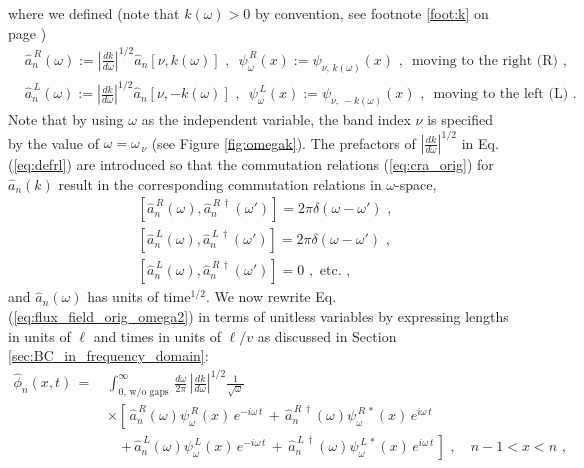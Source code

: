 %
where we defined (note that $k(\omega)>0$ by convention, see footnote \ref{foot:k} on page \pageref{foot:k})
%
\begin{subequations} \label{eq:defrl}
\begin{eqnarray}
& \hat{a}_n^{\,R}(\omega) := \displaystyle{\left| \frac{d k}{d \omega} \right|^{1/2}} \hat{a}_n\left[ \nu, k(\omega) \right] \, \, , 
\, \, \, \psi_{\omega}^{\,R}(x) := \psi_{\nu,\,k(\omega)}(x) \, \, , \, \, \,  \text{moving to the right (R)} \, \, , \\[2mm]
& \hat{a}_n^{\,L}(\omega) := \displaystyle{\left| \frac{d k}{d \omega} \right|^{1/2}} \hat{a}_n\left[ \nu, - k(\omega) \right] \, \, , 
\, \, \, \psi_{\omega}^{\,L}(x) := \psi_{\nu,\,-k(\omega)}(x) \, \, , \, \, \,  \text{moving to the left (L)} \, \, .
\end{eqnarray}
\end{subequations}
%
Note that by using $\omega$ as the independent variable, the band index $\nu$ is specified by the value of 
$\omega = \omega_{\,\nu}$ (see Figure \ref{fig:omegak}).
The prefactors of $\displaystyle{\left| \frac{d k}{d \omega} \right|^{1/2}}$ 
in Eq.\,(\ref{eq:defrl}) are introduced so that the commutation relations (\ref{eq:cra_orig}) 
for $\hat{a}_n(k)$ result in the corresponding commutation relations in $\omega$-space,
%
\begin{subequations} \label{eq:cra_omega}
\begin{eqnarray}
    & \left[ \hat{a}_n^{\,R}(\omega),{\hat a}_n^{\,R \, \dagger}(\omega') \right] = 2 \pi \delta(\omega - \omega') \, \, , \\[1mm]
    & \left[ \hat{a}_n^{\,L}(\omega),{\hat a}_n^{\,L \, \dagger}(\omega') \right] = 2 \pi \delta(\omega - \omega') \, \, , \\[1mm]
    & \left[ \hat{a}_n^{\,L}(\omega),{\hat a}_n^{\,R \, \dagger}(\omega') \right] = 0 \, \, , \, \, \text{etc.} \, \, ,
\end{eqnarray}
\end{subequations}
%
and $\hat{a}_n(\omega)$ has units of $\text{time}^{1/2}$.
\newpage
We now rewrite Eq.\,(\ref{eq:flux_field_orig_omega2}) in terms of unitless variables 
by expressing lengths in units of $\ell$ and times in units of $\ell/v$
as discussed in Section \ref{sec:BC_in_frequency_domain}:
%
\begin{equation} \label{eq:flux_field}
\begin{split}
    \hat{\phi}_n(x,t) \, = \, &
    \int_{0, \, \text{w/o gaps}}^{\infty} \, \frac{d\omega}{2 \pi} \, \left| \frac{d k}{d \omega} \right|^{1/2}
        \frac{1}{\sqrt{\omega}} \\[2mm]
    & \times \left[\, \hat{a}_n^{\,R}(\omega) \psi_{\omega}^{\,R}(x) \, e^{-i \omega \, t} \, + \,
    \hat{a}_n^{\,R \, \dagger}(\omega) \psi_{\omega}^{\,R \, *}(x) \, e^{i \omega \, t} \right. \\[2mm]
    & \quad \left. + \, \hat{a}_n^{\,L}(\omega) \psi_{\omega}^{\,L}(x) \, e^{-i \omega \, t} \, + \,
    \hat{a}_n^{\,L \, \dagger}(\omega) \psi_{\omega}^{\,L \, *}(x) \, e^{i \omega \, t} \, \right]
    \, \, , \quad n-1 < x < n \, \, ,
\end{split}
\end{equation}
